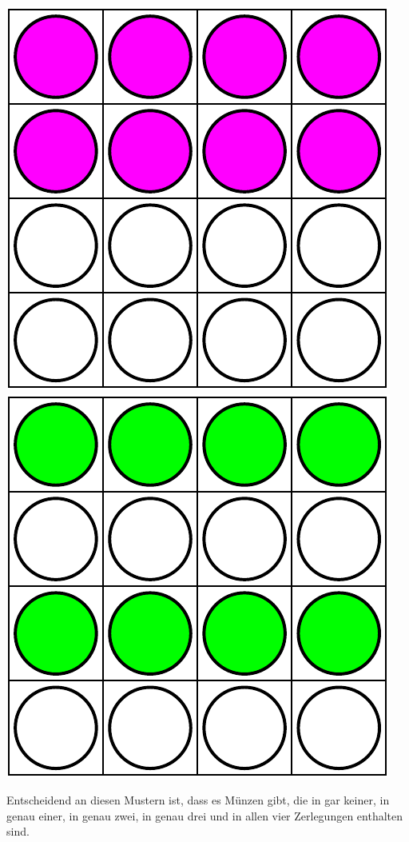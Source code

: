 \documentclass{uebungszettel}
\begin{document}
\begin{center}
 \includegraphics[scale = 0.4]{zerlegung3}\hspace*{3 mm}
 \includegraphics[scale = 0.4]{zerlegung4}
\end{center}

Entscheidend an diesen Mustern ist, dass es Münzen gibt, die in gar keiner, in genau einer, in genau zwei, in genau drei und in allen vier Zerlegungen enthalten sind.
\end{document}
